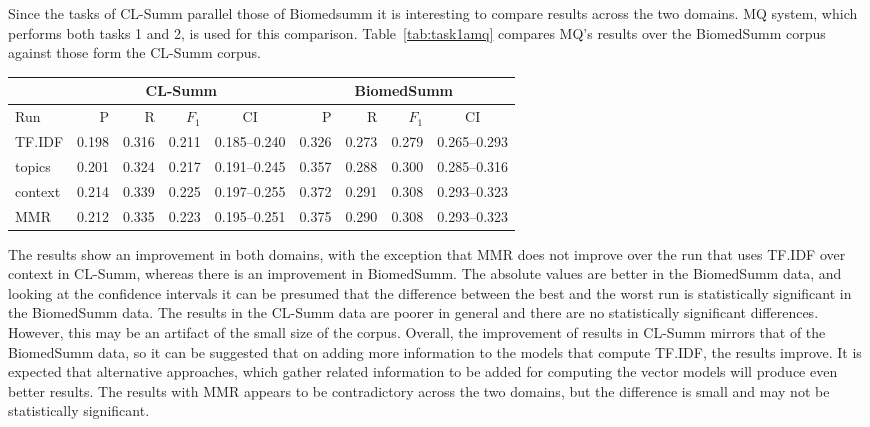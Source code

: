 \documentclass[11pt]{article}
\begin{document}

Since the tasks of CL-Summ parallel those of Biomedsumm
it is interesting to compare results across the two domains. MQ
system, which performs both tasks 1 and 2, is used for this comparison.
Table~\ref{tab:task1amq} compares MQ's results over the BiomedSumm corpus
against those form the CL-Summ corpus.

\begin{table*}
  \centering
  \begin{tabular}{|l|r|r|r|c|r|r|r|c|}
  	\hline
	& \multicolumn{4}{|c|}{CL-Summ} & \multicolumn{4}{|c|}{BiomedSumm}\\
	\hline
	Run & P & R & $F_1$ & CI & P & R & $F_1$ & CI\\
	\hline
    TF.IDF & 0.198 & 0.316 & 0.211 & 0.185--0.240 & 0.326 & 0.273 & 0.279 & 0.265--0.293\\
	topics & 0.201 & 0.324 & 0.217 & 0.191--0.245 & 0.357 & 0.288 & 0.300
	& 0.285--0.316\\
	context & 0.214 & 0.339 & 0.225 & 0.197--0.255 & 0.372 & 0.291 & 0.308
	& 0.293--0.323\\
	MMR & 0.212 & 0.335 & 0.223 & 0.195--0.251 &  0.375 & 0.290 & 0.308 & 0.293--0.323\\ 
	\hline
  \end{tabular}
  \caption{ROUGE-L results of the MQ system runs for Task 1A.}
  \label{tab:task1amq}
\end{table*}

The results show an improvement in both domains, with the exception that MMR does 
not improve over the run that uses TF.IDF over context in CL-Summ, whereas there is 
an improvement in BiomedSumm. The absolute values are better in the BiomedSumm data, 
and looking at the confidence intervals it can be presumed that the difference between 
the best and the worst run is statistically significant in the BiomedSumm data. 
The results in the CL-Summ data are poorer in general and there are no statistically 
significant differences. However, this may be an artifact of the small size of the corpus. 
Overall, the improvement of results in CL-Summ mirrors that of the BiomedSumm data, so it 
can be suggested that on adding more information to the models that compute TF.IDF, the 
results improve. It is expected that alternative approaches, which gather related information 
to be added for computing the vector models will produce even better results. The results 
with MMR appears to be contradictory across the two domains, but the difference is small 
and may not be statistically significant.
\end{document}
